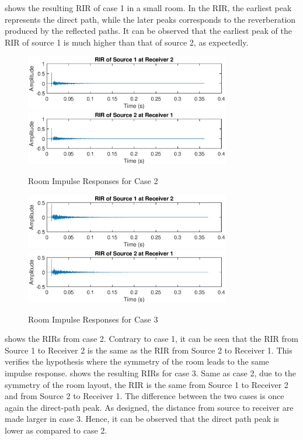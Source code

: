 \documentclass[a4paper,twoside,12pt,hidelinks]{article}
\begin{document}
 shows the resulting RIR of case 1 in a small room. In the RIR, the earliest peak represents the direct path, while the later peaks corresponds to the reverberation produced by the reflected paths. It can be observed that the earliest peak of the RIR of source 1 is much higher than that of source 2, as expectedly.
\begin{figure}[H]
\centering
\includegraphics[width=0.8\textwidth]{c2s1r2}
\includegraphics[width=0.8\textwidth]{c2s2r1}
\caption{Room Impulse Responses for Case 2}
\label{fig:case2}
\end{figure}
\begin{figure}[H]
\centering
\includegraphics[width=0.8\textwidth]{c3s1r2}
\includegraphics[width=0.8\textwidth]{c3s2r1}
\caption{Room Impulse Responses for Case 3}
\label{fig:case3}
\end{figure}
 shows the RIRs from case 2. Contrary to case 1, it can be seen that the RIR from Source 1 to Receiver 2 is the same as the RIR from Source 2 to Receiver 1. This verifies the hypothesis where the symmetry of the room leads to the same impulse response.  shows the resulting RIRs for case 3. Same as case 2, due to the symmetry of the room layout, the RIR is the same from Source 1 to Receiver 2 and from Source 2 to Receiver 1. The difference between the two cases is once again the direct-path peak. As designed, the distance from source to receiver are made larger in case 3. Hence, it can be observed that the direct path peak is lower as compared to case 2. 
\end{document}
